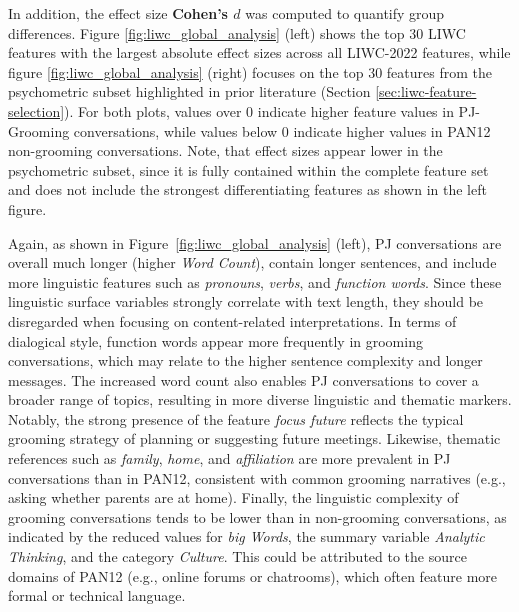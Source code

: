 In addition, the effect size \textbf{Cohen’s $d$} \cite{cohen1988} was computed to quantify group differences. Figure \ref{fig:liwc_global_analysis} (left) shows the top 30 LIWC features with the largest absolute effect sizes across all LIWC-2022 features, while figure \ref{fig:liwc_global_analysis} (right) focuses on the top 30 features from the psychometric subset highlighted in prior literature (Section \ref{sec:liwc-feature-selection}). For both plots, values over 0 indicate higher feature values in PJ-Grooming conversations, while values below 0 indicate higher values in PAN12 non-grooming conversations. Note, that effect sizes appear lower in the psychometric subset, since it is fully contained within the complete feature set and does not include the strongest differentiating features as shown in the left figure. 

Again, as shown in Figure~\ref{fig:liwc_global_analysis} (left), PJ conversations are overall much longer (higher \textit{Word Count}), contain longer sentences, and include more linguistic features such as \textit{pronouns}, \textit{verbs}, and \textit{function words}. Since these linguistic surface variables strongly correlate with text length, they should be disregarded when focusing on content-related interpretations. In terms of dialogical style, function words appear more frequently in grooming conversations, which may relate to the higher sentence complexity and longer messages. The increased word count also enables PJ conversations to cover a broader range of topics, resulting in more diverse linguistic and thematic markers. Notably, the strong presence of the feature \textit{focus future} reflects the typical grooming strategy of planning or suggesting future meetings. Likewise, thematic references such as \textit{family}, \textit{home}, and \textit{affiliation} are more prevalent in PJ conversations than in PAN12, consistent with common grooming narratives (e.g., asking whether parents are at home).  Finally, the linguistic complexity of grooming conversations tends to be lower than in non-grooming conversations, as indicated by the reduced values for \textit{big Words}, the summary variable \textit{Analytic Thinking}, and the category \textit{Culture}. This could be attributed to the source domains of PAN12 (e.g., online forums or chatrooms), which often feature more formal or technical language.


